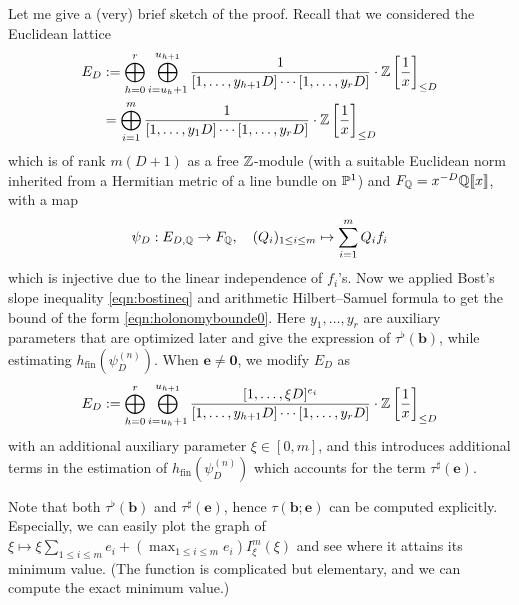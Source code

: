 Let me give a (very) brief sketch of the proof.
Recall that we considered the Euclidean lattice
\begin{align*}
    E_D &:= \bigoplus_{h=0}^{r} \bigoplus_{i=u_h + 1}^{u_{h+1}} \frac{1}{[1, \dots, y_{h+1}D] \cdots [1, \dots,  y_{r}D]} \cdot \mathbb{Z}\left[\frac{1}{x}\right]_{\le D} \\
    &=\bigoplus_{i=1}^{m} \frac{1}{[1, \dots, y_1 D] \cdots [1, \dots, y_{r}D]} \cdot \mathbb{Z} \left[\frac{1}{x} \right]_{\le D}
\end{align*}
which is of rank $m(D+1)$ as a free $\mathbb{Z}$-module (with a suitable Euclidean norm inherited from a Hermitian metric of a line bundle on $\mathbb{P}^1$) and $F_{\mathbb{Q}} = x^{-D} \mathbb{Q} \llbracket x \rrbracket$, with a map
$$
    \psi_D: E_{D, \mathbb{Q}} \to F_{\mathbb{Q}}, \quad (Q_i)_{1 \le i \le m} \mapsto \sum_{i=1}^{m} Q_i f_i
$$
which is injective due to the linear independence of $f_i$'s.
Now we applied Bost's slope inequality \eqref{eqn:bostineq} and arithmetic Hilbert--Samuel formula to get the bound of the form \eqref{eqn:holonomybounde0}.
Here $y_1, \dots, y_r$ are auxiliary parameters that are optimized later and give the expression of $\tau^\flat(\mathbf{b})$, while estimating $h_{\mathrm{fin}}(\psi_D^{(n)})$.
When $\mathbf{e} \ne \mathbf{0}$, we modify $E_D$ as
\begin{align*}
    E_D := \bigoplus_{h=0}^{r} \bigoplus_{i=u_h + 1}^{u_{h+1}} \frac{[1, \dots, \xi D]^{e_i}}{[1, \dots, y_{h+1}D] \cdots [1, \dots,  y_{r}D]} \cdot \mathbb{Z}\left[\frac{1}{x}\right]_{\le D}
\end{align*}
with an additional auxiliary parameter $\xi \in [0, m]$, and this introduces additional terms in the estimation of $h_{\mathrm{fin}}(\psi_D^{(n)})$ which accounts for the term $\tau^\sharp(\mathbf{e})$.

Note that both $\tau^\flat(\mathbf{b})$ and $\tau^\sharp(\mathbf{e})$, hence $\tau(\mathbf{b}; \mathbf{e})$ can be computed explicitly.
Especially, we can easily plot the graph of $\xi \mapsto \xi \sum_{1 \le i \le m} e_i + (\max_{1 \le i \le m} e_i) I_\xi^m(\xi)$ and see where it attains its minimum value.
(The function is complicated but elementary, and we can compute the exact minimum value.)